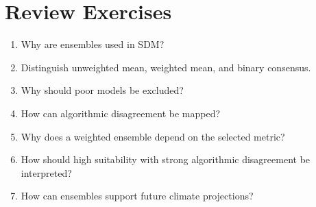 \section{Review Exercises}
\begin{enumerate}
\item Why are ensembles used in SDM?
\item Distinguish unweighted mean, weighted mean, and binary consensus.
\item Why should poor models be excluded?
\item How can algorithmic disagreement be mapped?
\item Why does a weighted ensemble depend on the selected metric?
\item How should high suitability with strong algorithmic disagreement be interpreted?
\item How can ensembles support future climate projections?
\end{enumerate}
